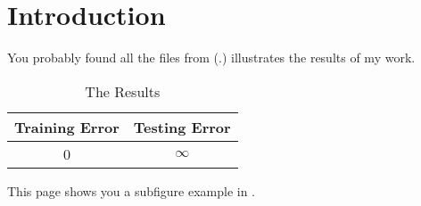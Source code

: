\chapter{Introduction} \label{Chapter:Introduction}
You probably found all the files from (\cite{Gunn:2001:pdflatex}.)
 illustrates the results of my work.
\begin{table}[!htb]
  \centering
  \begin{tabular}{cc}
  \toprule
  \textbf{Training Error} & \textbf{Testing Error}\\
  \midrule
  0 & $\infty$\\
  \bottomrule
  \end{tabular}
  \caption{The Results}
  \label{Table:tabex}
\end{table}



This page shows you a subfigure example in .
